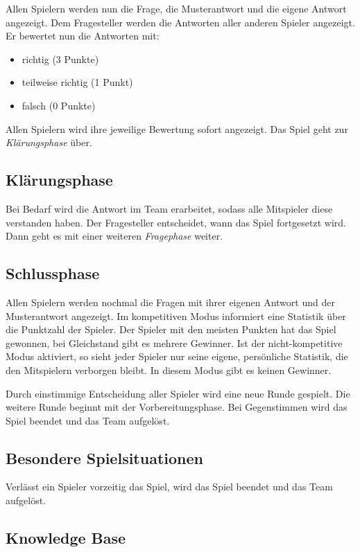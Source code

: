 \documentclass[a4paper,11pt,listof=numbered,glossary=totoc,parskip=half]{scrreprt}
\begin{document}
Allen Spielern werden nun die Frage, die Musterantwort und die eigene Antwort angezeigt. Dem Fragesteller werden die Antworten aller anderen Spieler angezeigt. Er bewertet nun die Antworten mit:

\begin{itemize}
	\item richtig (3 Punkte)
	\item teilweise richtig (1 Punkt)
	\item falsch (0 Punkte)
\end{itemize}

Allen Spielern wird ihre jeweilige Bewertung sofort angezeigt. Das Spiel geht zur \textit{Klärungsphase} über.

\subsection{Klärungsphase}

Bei Bedarf wird die Antwort im Team erarbeitet, sodass alle Mitspieler diese verstanden haben. Der Fragesteller entscheidet, wann das Spiel fortgesetzt wird. Dann geht es mit einer weiteren \textit{Fragephase} weiter.

\subsection{Schlussphase}

Allen Spielern werden nochmal die Fragen mit ihrer eigenen Antwort und der Musterantwort angezeigt.
Im kompetitiven Modus informiert eine Statistik über die Punktzahl der Spieler. Der Spieler mit den meisten Punkten hat das Spiel gewonnen, bei Gleichstand gibt es mehrere Gewinner.
Ist der nicht-kompetitive Modus aktiviert, so sieht jeder Spieler nur seine eigene, persönliche Statistik, die den Mitspielern verborgen bleibt. In diesem Modus gibt es keinen Gewinner.

Durch einstimmige Entscheidung aller Spieler wird eine neue Runde gespielt. Die weitere Runde beginnt mit der Vorbereitungsphase. Bei Gegenstimmen wird das Spiel beendet und das Team aufgelöst.

\subsection{Besondere Spielsituationen}

Verlässt ein Spieler vorzeitig das Spiel, wird das Spiel beendet und das Team aufgelöst.

\subsection{Knowledge Base}
\end{document}
